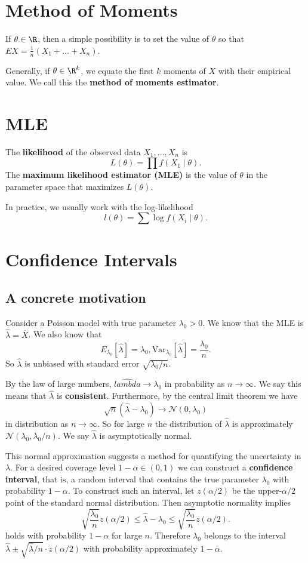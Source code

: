 \section{Method of Moments}
If $\theta\in\R$, then a simple possibility is to set the value of $\theta$ so that $E X = \frac{1}{n}(X_1+\dots+X_n)$. 

Generally, if $\theta\in\R^k$, we equate the first $k$ moments of $X$ with their empirical value. We call this the {\bf method of moments estimator}. 

\section{MLE}
The {\bf likelihood} of the observed data $X_1, \dots, X_n$ is 
\[L(\theta) = \prod f(X_1\mid\theta). \]
The {\bf maximum likelihood estimator (MLE)} is the value of $\theta$ in the parameter space that maximizes $L(\theta)$. 

In practice, we usually work with the log-likelihood 
\[l(\theta) = \sum \log f(X_i\mid\theta). \]
\section{Confidence Intervals}
\subsection{A concrete motivation}
Consider a Poisson model with true parameter $\lambda_0>0$. We know that the MLE is $\hat{\lambda}=\overline{X}$. We also know that 
\[E_{\lambda_0}[\hat{\lambda}] = \lambda_0, \mathrm{Var}_{\lambda_0}[\hat{\lambda}] = \frac{\lambda_0}{n}. \]
So $\hat{\lambda}$ is unbiased with standard error $\sqrt{\lambda_0/n}$. 

By the law of large numbers, $\hat{lambda} \to \lambda_0$ in probability as $n\to\infty$. We say this means that $\hat{\lambda}$ is {\bf consistent}. Furthermore, by the central limit theorem we have 
\[\sqrt{n}(\hat{\lambda}-\lambda_0) \to \mathcal{N}(0, \lambda_0) \]
in distribution as $n\to\infty$. So for large $n$ the distribution of $\hat{\lambda}$ is approximately $\mathcal{N}(\lambda_0, \lambda_0/n)$. We say $\hat{\lambda}$ is asymptotically normal. 

This normal approximation suggests a method for quantifying the uncertainty in $\lambda$. For a desired coverage level $1-\alpha\in(0,1)$ we can construct a {\bf confidence interval}, that is, a random interval that contains the true parameter $\lambda_0$ with probability $1-\alpha$. To construct such an interval, let $z(\alpha/2)$ be the upper-$\alpha/2$ point of the standard normal distribution. Then asymptotic normality implies 
\[\sqrt{\frac{\lambda_0}{n}}z(\alpha/2) \leq\hat{\lambda}-\lambda_0\leq\sqrt{\frac{\lambda_0}{n}}z(\alpha/2). \]
holds with probability $1-\alpha$ for large $n$. Therefore $\lambda_0$ belongs to the interval $\hat{\lambda} \pm \sqrt{\hat{\lambda}/n}\cdot z(\alpha/2)$ with probability approximately $1-\alpha$. 

